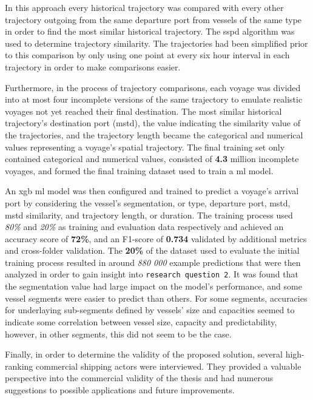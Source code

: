 In this approach every historical trajectory was compared with every other trajectory outgoing from the same departure port from vessels of the same type in order to find the most similar historical trajectory. The \acrfull{sspd} algorithm was used to determine trajectory similarity. The trajectories had been simplified prior to this comparison by only using one point at every six hour interval in each trajectory in order to make comparisons easier.

Furthermore, in the process of trajectory comparisons, each voyage was divided into at most four incomplete versions of the same trajectory to emulate realistic voyages not yet reached their final destination. The most similar historical trajectory's destination port (\acrshort{mstd}), the value indicating the similarity value of the trajectories, and the trajectory length became the categorical and numerical values representing a voyage's spatial trajectory. The final training set only contained categorical and numerical values, consisted of \textbf{4.3} million incomplete voyages, and formed the final training dataset used to train a \acrshort{ml} model.

An \acrfull{xgb} \acrshort{ml} model was then configured and trained to predict a voyage's arrival port by considering the vessel's segmentation, or type, departure port, \acrshort{mstd}, \acrshort{mstd} similarity, and trajectory length, or duration. The training process used \textit{80\%} and \textit{20\%} as training and evaluation data respectively and achieved an accuracy score of \textbf{72\%}, and an F1-score of \textbf{0.734} validated by additional metrics and cross-folder validation. The \textbf{20\%} of the dataset used to evaluate the initial training process resulted in around \textit{880 000} example predictions that were then analyzed in order to gain insight into \texttt{research question 2}. It was found that the segmentation value had large impact on the model's performance, and some vessel segments were easier to predict than others. For some segments, accuracies for underlaying sub-segments defined by vessels' size and capacities seemed to indicate some correlation between vessel size, capacity and predictability, however, in other segments, this did not seem to be the case.

Finally, in order to determine the validity of the proposed solution, several high-ranking commercial shipping actors were interviewed. They provided a valuable perspective into the commercial validity of the thesis and had numerous suggestions to possible applications and future improvements.

